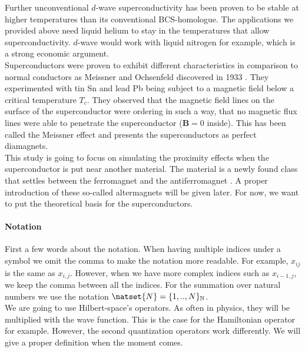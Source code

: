 \documentclass[../main.tex]{subfile}
\begin{document}
Further unconventional $d$-wave superconductivity has been proven to be stable at higher temperatures than its conventional BCS-homologue.
The applications we provided above need liquid helium to stay in the temperatures that allow superconductivity. $d$-wave
would work with liquid nitrogen for example, which is a strong economic argument.\\

Superconductors were proven to exhibit different characteristics in comparison to normal conductors as
Meissner and Ochsenfeld discovered in 1933 \cite{MeissnerOchsenfeld1933}. 
They experimented with tin Sn and lead Pb being subject to a magnetic field below a critical temperature $T_c$. They observed that the magnetic field lines on the surface
of the superconductor were ordering in such a way, that no magnetic flux lines were able to penetrate the superconductor ($\bm{B} = 0$ inside). This has been called the Meissner effect
and presents the superconductors as perfect diamagnets.\\

This study is going to focus on simulating the proximity effects when the superconductor is put near another material. The material is a newly found class 
that settles between the ferromagnet and the antiferromagnet \cite{Smejkal2022}. A proper introduction of these so-called altermagnets will be given later.
 For now, we want to put the theoretical basis for the superconductors.\\

\paragraph{Notation}$~$\\
First a few words about the notation. When having multiple indices under a symbol we omit the comma to make the notation more readable. 
For example, $x_{ij}$ is the same as $x_{i,j}$. However, when we have more complex indices such as $x_{i-1, j}$, we keep the comma between all
the indices. For the summation over natural numbers we use the notation $\natset{N} = \{1,..,N\}_{\mathbb{N}}$.\\

We are going to use Hilbert-space's operators. As often in physics, they will be multiplied with the wave function. This is the case for the Hamiltonian 
operator for example. However, the second quantization operators work differently. We will give a proper definition when the moment comes.
\end{document}

